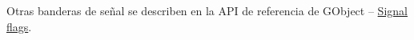 Otras banderas de señal se describen en la API de referencia de GObject --
\href{https://docs.gtk.org/gobject/flags.SignalFlags.html}{Signal flags}.




  

